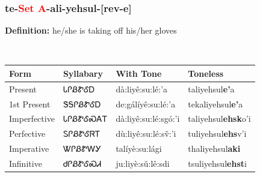 \subsubsection*{te{-}\textcolor{Red}{Set A}{-}ali{-}\textbf{yehsul}{-}[rev-e]}
\nopagebreak
\textbf{Definition: } he/she is taking off his/her gloves
\\[0.5em]
\begin{tabularx}{\textwidth}{l X X X}%
\toprule%
\textbf{Form}&\textbf{Syllabary}&\textbf{With Tone}&\textbf{Toneless}\\%
\midrule%
Present&ᏓᎵᏰᏑᎴᎠ&dà:liyê:su:lé:’a&taliyehsul\textbf{e'}a\\%
1st Present&ᏕᎦᎵᏰᏑᎴᎠ&de:gálíyê:su:lé:’a&tekaliyehsul\textbf{e'}a\\%
Imperfective&ᏓᎵᏰᏑᎴᏍᎪᎢ&dà:liyê:su:lé:sgó:’i&taliyehsul\textbf{ehsk}o'i\\%
Perfective&ᏚᎵᏰᏑᎴᏒᎢ&dù:liyê:su:lé:sv̌:’i&tuliyehsul\textbf{ehs}v'i\\%
Imperative&ᏔᎵᏰᏑᎳᎩ&talíyè:su:lági&thaliyehsul\textbf{aki}\\%
Infinitive&ᏧᎵᏰᏑᎴᏍᏗ&ju:liyè:sǔ:lê:sdi&tsuliyehsul\textbf{ehst}i\\%
\bottomrule%
\end{tabularx}
\\[1em]